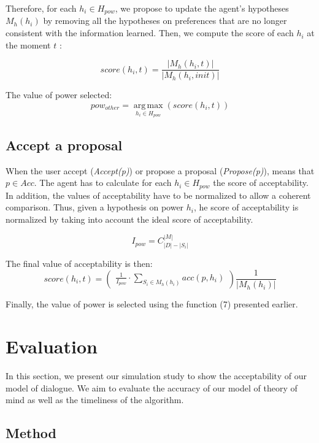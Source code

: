 \documentclass[sigconf]{aamas}  %
\begin{document}
	Therefore, for each  $h_i \in H_{pow}$, we propose to update the agent's hypotheses $M_h(h_i)$ by removing all the hypotheses on preferences that are no longer consistent with the information learned. 
	Then, we compute the score of each $h_i$ at the moment $t$ :
	
	$$score(h_i,t) = \frac{|M_h(h_i, t)|}{|M_h(h_i, init)|}$$
	
	The value of power selected:
	\begin{equation}
	pow_{other} = \operatorname*{arg\,max}_{h_i \in H_{pow}} ( score(h_i,t))
	\end{equation}
	
	\subsection{Accept a proposal}
	When the user accept (\emph{Accept(p)}) or propose a proposal (\emph{Propose(p)}), means that $p \in Acc$. 
	The agent has to calculate for each $h_i \in H_{pow}$ the score of acceptability. In addition, the values of acceptability have to be normalized to allow a coherent comparison. Thus, given a hypothesis on power $h_i$, he score of acceptability is normalized by taking into account the ideal score of acceptability.
	
	$$I_{pow} =  C_{|D|-|S_i|}^{|M|}$$
	
	
	The final value of acceptability is then:
	\begin{equation}
	score(h_i, t)= \left( \begin{array}{c}  \frac{1}{I_{pow}} \cdot \sum_{S_i \in M_h(h_i) } acc(p, h_i) 
	\end{array}\right) \frac{1}{| M_h(h_i)|}
	\end{equation}
	
	Finally, the value of power is selected using the function (7) presented earlier.
	
	
	\section{Evaluation}
	In this section, we present our simulation study to show the acceptability of our model of dialogue. We aim to evaluate the accuracy of our model of theory of mind as well as the timeliness of the algorithm.
	
	\subsection{Method}
	
\end{document}
